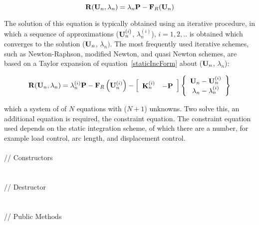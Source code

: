 \begin{equation}
{\bf R}({\bf U}_{n}, \lambda_n) = \lambda_n {\bf P} - {\bf F}_R({\bf U}_{n})
\label{staticIncForm}
\end{equation}

The solution of this equation is typically obtained using an iterative
procedure, in which a sequence of approximations
(${\bf U}_{n}^{(i)}$, $\lambda_n^{(i)}$), $i=1,2, ..$ is obtained which
converges to the solution (${\bf U}_n$, $\lambda_n)$. The most
frequently used iterative schemes, such as Newton-Raphson, modified
Newton, and quasi Newton schemes, are based on a Taylor expansion of
equation~\ref{staticIncForm} about (${\bf U}_{n}$, $\lambda_n$):     

\begin{equation} 
{\bf R}({\bf U}_{n},\lambda_n) = \lambda_n^{(i)} {\bf P} 
 - {\bf F}_{R}\left({\bf U}_{n}^{(i)} \right) - \left[
\begin{array}{cc}
{\bf K}_n^{(i)} & -{\bf P} \\
\end{array} \right] 
\left\{
\begin{array}{c}
{\bf U}_{n} - {\bf U}_{n}^{(i)}  \\ 
\lambda_n - \lambda_n^{(i)} 
\end{array} \right\}
\label{staticFormTaylor}
\end{equation} 

\noindent which  a system of of $N$ equations with ($N+1$)
unknowns. Two solve this, an additional equation is required, the
constraint equation. The constraint equation used depends on the
static integration scheme, of which there are a number, for example
load control, arc length, and displacement control. \\

\pagebreak
{} \\
\indent\indent // Constructors \\
\indent{}\\  \\
\indent\indent // Destructor \\
\indent{}\\  \\
\indent\indent // Public Methods \\
\indent{} \\
\indent{} \\
\indent{} \\
\indent{} \\
\indent{} \\

